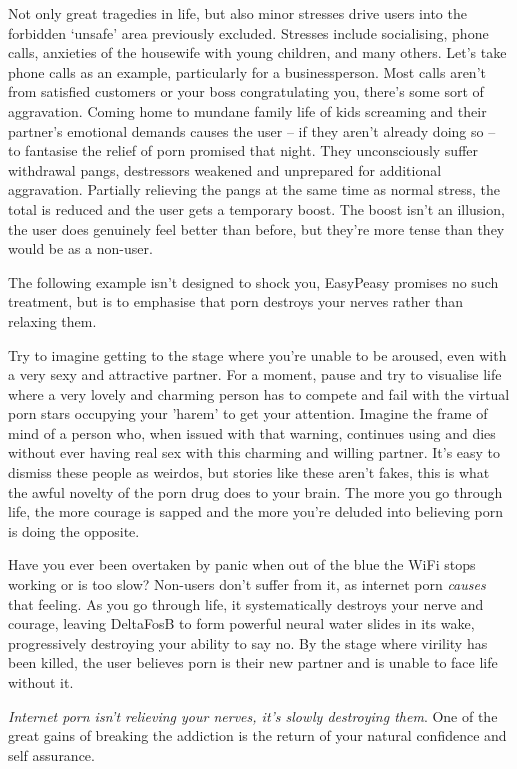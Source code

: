\documentclass[
]{book}
\begin{document}
Not only great tragedies in life, but also minor stresses drive users into the forbidden `unsafe' area previously excluded. Stresses include socialising, phone calls, anxieties of the housewife with young children, and many others. Let's take phone calls as an example, particularly for a businessperson. Most calls aren't from satisfied customers or your boss congratulating you, there's some sort of aggravation. Coming home to mundane family life of kids screaming and their partner's emotional demands causes the user -- if they aren't already doing so -- to fantasise the relief of porn promised that night. They unconsciously suffer withdrawal pangs, destressors weakened and unprepared for additional aggravation. Partially relieving the pangs at the same time as normal stress, the total is reduced and the user gets a temporary boost. The boost isn't an illusion, the user does genuinely feel better than before, but they're more tense than they would be as a non-user.

The following example isn't designed to shock you, EasyPeasy promises no such treatment, but is to emphasise that porn destroys your nerves rather than relaxing them.

Try to imagine getting to the stage where you're unable to be aroused, even with a very sexy and attractive partner. For a moment, pause and try to visualise life where a very lovely and charming person has to compete and fail with the virtual porn stars occupying your 'harem' to get your attention. Imagine the frame of mind of a person who, when issued with that warning, continues using and dies without ever having real sex with this charming and willing partner. It's easy to dismiss these people as weirdos, but stories like these aren't fakes, this is what the awful novelty of the porn drug does to your brain. The more you go through life, the more courage is sapped and the more you're deluded into believing porn is doing the opposite.

Have you ever been overtaken by panic when out of the blue the WiFi stops working or is too slow? Non-users don't suffer from it, as internet porn \emph{causes} that feeling. As you go through life, it systematically destroys your nerve and courage, leaving DeltaFosB to form powerful neural water slides in its wake, progressively destroying your ability to say no. By the stage where virility has been killed, the user believes porn is their new partner and is unable to face life without it.

\emph{Internet porn isn't relieving your nerves, it's slowly destroying them}. One of the great gains of breaking the addiction is the return of your natural confidence and self assurance.
\end{document}
